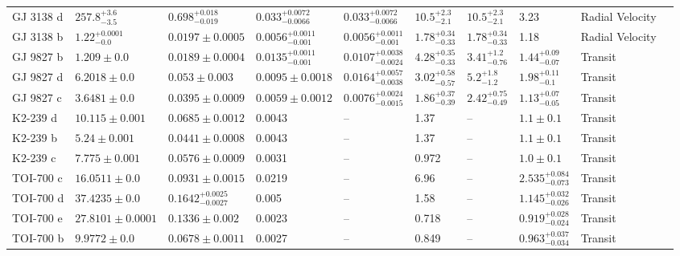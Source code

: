 \begin{tabular}{llllllllll}
GJ 3138 d & $257.8^{+3.6}_{-3.5}$ & $0.698^{+0.018}_{-0.019}$ & $0.033^{+0.0072}_{-0.0066}$ & $0.033^{+0.0072}_{-0.0066}$ & $10.5^{+2.3}_{-2.1}$ & $10.5^{+2.3}_{-2.1}$ & 3.23 & Radial Velocity & \cite{ASTUDILLO_DEFRU_ET_AL__2017} \\
GJ 3138 b & $1.22^{+0.0001}_{-0.0}$ & $0.0197 \pm 0.0005$ & $0.0056^{+0.0011}_{-0.001}$ & $0.0056^{+0.0011}_{-0.001}$ & $1.78^{+0.34}_{-0.33}$ & $1.78^{+0.34}_{-0.33}$ & 1.18 & Radial Velocity & \cite{ASTUDILLO_DEFRU_ET_AL__2017} \\
GJ 9827 b & $1.209 \pm 0.0$ & $0.0189 \pm 0.0004$ & $0.0135^{+0.0011}_{-0.001}$ & $0.0107^{+0.0038}_{-0.0024}$ & $4.28^{+0.35}_{-0.33}$ & $3.41^{+1.2}_{-0.76}$ & $1.44^{+0.09}_{-0.07}$ & Transit & \cite{PASSEGGER_ET_AL_2024} \\
GJ 9827 d & $6.2018 \pm 0.0$ & $0.053 \pm 0.003$ & $0.0095 \pm 0.0018$ & $0.0164^{+0.0057}_{-0.0038}$ & $3.02^{+0.58}_{-0.57}$ & $5.2^{+1.8}_{-1.2}$ & $1.98^{+0.11}_{-0.1}$ & Transit & \cite{PIAULET_GHORAYEB_ET_AL__2024} \\
GJ 9827 c & $3.6481 \pm 0.0$ & $0.0395 \pm 0.0009$ & $0.0059 \pm 0.0012$ & $0.0076^{+0.0024}_{-0.0015}$ & $1.86^{+0.37}_{-0.39}$ & $2.42^{+0.75}_{-0.49}$ & $1.13^{+0.07}_{-0.05}$ & Transit & \cite{PASSEGGER_ET_AL_2024} \\
K2-239 d & $10.115 \pm 0.001$ & $0.0685 \pm 0.0012$ & 0.0043 & -- & 1.37 & -- & $1.1 \pm 0.1$ & Transit & \cite{D_IACUTE_EZ_ALONSO_ET_AL__2018} \\
K2-239 b & $5.24 \pm 0.001$ & $0.0441 \pm 0.0008$ & 0.0043 & -- & 1.37 & -- & $1.1 \pm 0.1$ & Transit & \cite{D_IACUTE_EZ_ALONSO_ET_AL__2018} \\
K2-239 c & $7.775 \pm 0.001$ & $0.0576 \pm 0.0009$ & 0.0031 & -- & 0.972 & -- & $1.0 \pm 0.1$ & Transit & \cite{D_IACUTE_EZ_ALONSO_ET_AL__2018} \\
TOI-700 c & $16.0511 \pm 0.0$ & $0.0931 \pm 0.0015$ & 0.0219 & -- & 6.96 & -- & $2.535^{+0.084}_{-0.073}$ & Transit & \cite{PASS_ET_AL_2026} \\
TOI-700 d & $37.4235 \pm 0.0$ & $0.1642^{+0.0025}_{-0.0027}$ & 0.005 & -- & 1.58 & -- & $1.145^{+0.032}_{-0.026}$ & Transit & \cite{PASS_ET_AL_2026} \\
TOI-700 e & $27.8101 \pm 0.0001$ & $0.1336 \pm 0.002$ & 0.0023 & -- & 0.718 & -- & $0.919^{+0.028}_{-0.024}$ & Transit & \cite{PASS_ET_AL_2026} \\
TOI-700 b & $9.9772 \pm 0.0$ & $0.0678 \pm 0.0011$ & 0.0027 & -- & 0.849 & -- & $0.963^{+0.037}_{-0.034}$ & Transit & \cite{PASS_ET_AL_2026} \\

\end{tabular}
